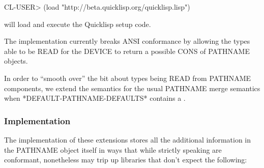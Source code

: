 \documentclass[10pt]{book}
\begin{document}
\begin{listing-lisp}
  CL-USER> (load "http://beta.quicklisp.org/quicklisp.lisp")
\end{listing-lisp}

will load and execute the Quicklisp setup code.

The implementation currently breaks ANSI conformance by allowing the
types able to be READ for the DEVICE to return a possible CONS of
PATHNAME objects.  %

In order to ``smooth over'' the bit about types being READ from
PATHNAME components, we extend the semantics for the usual PATHNAME
merge semantics when *DEFAULT-PATHNAME-DEFAULTS* contains a
.  


\subsubsection{Implementation}

The implementation of these extensions stores all the additional
information in the PATHNAME object itself in ways that while strictly
speaking are conformant, nonetheless may trip up libraries that don't
expect the following:
\end{document}
